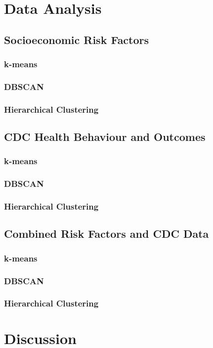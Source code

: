 \documentclass{article}
\begin{document}
	\section{Data Analysis}
		\label{futurework}
		\subsection{Socioeconomic Risk Factors}
			\subsubsection{k-means}
			\subsubsection{DBSCAN}
			\subsubsection{Hierarchical Clustering}
		\subsection{CDC Health Behaviour and Outcomes}
			\subsubsection{k-means}
			\subsubsection{DBSCAN}
			\subsubsection{Hierarchical Clustering}
		\subsection{Combined Risk Factors and CDC Data}
			\subsubsection{k-means}
			\subsubsection{DBSCAN}
			\subsubsection{Hierarchical Clustering}
	\section{Discussion}
	
	
\end{document}
